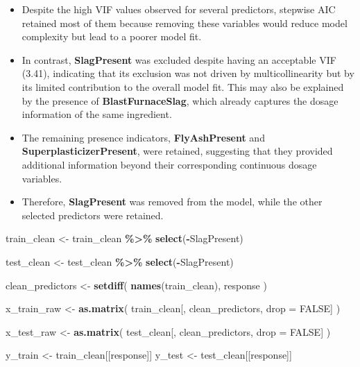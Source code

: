\documentclass[
  11pt,
]{article}
\newenvironment{Shaded}{\begin{snugshade}}{\end{snugshade}}
\newcommand{\AttributeTok}[1]{\textcolor[rgb]{0.13,0.29,0.53}{#1}}
\newcommand{\ConstantTok}[1]{\textcolor[rgb]{0.56,0.35,0.01}{#1}}
\newcommand{\FunctionTok}[1]{\textcolor[rgb]{0.13,0.29,0.53}{\textbf{#1}}}
\newcommand{\NormalTok}[1]{#1}
\newcommand{\OtherTok}[1]{\textcolor[rgb]{0.56,0.35,0.01}{#1}}
\newcommand{\SpecialCharTok}[1]{\textcolor[rgb]{0.81,0.36,0.00}{\textbf{#1}}}
\begin{document}
\begin{itemize}
\item
  Despite the high VIF values observed for several predictors, stepwise
  AIC retained most of them because removing these variables would
  reduce model complexity but lead to a poorer model fit.
\item
  In contrast, \textbf{SlagPresent} was excluded despite having an
  acceptable VIF (3.41), indicating that its exclusion was not driven by
  multicollinearity but by its limited contribution to the overall model
  fit. This may also be explained by the presence of
  \textbf{BlastFurnaceSlag}, which already captures the dosage
  information of the same ingredient.
\item
  The remaining presence indicators, \textbf{FlyAshPresent} and
  \textbf{SuperplasticizerPresent}, were retained, suggesting that they
  provided additional information beyond their corresponding continuous
  dosage variables.
\item
  Therefore, \textbf{SlagPresent} was removed from the model, while the
  other selected predictors were retained.
\end{itemize}

\begin{Shaded}
\begin{Highlighting}[]
\NormalTok{train\_clean }\OtherTok{\textless{}{-}}\NormalTok{ train\_clean }\SpecialCharTok{\%\textgreater{}\%}
  \FunctionTok{select}\NormalTok{(}\SpecialCharTok{{-}}\NormalTok{SlagPresent)}

\NormalTok{test\_clean }\OtherTok{\textless{}{-}}\NormalTok{ test\_clean }\SpecialCharTok{\%\textgreater{}\%}
  \FunctionTok{select}\NormalTok{(}\SpecialCharTok{{-}}\NormalTok{SlagPresent)}

\NormalTok{clean\_predictors }\OtherTok{\textless{}{-}} \FunctionTok{setdiff}\NormalTok{(}
  \FunctionTok{names}\NormalTok{(train\_clean),}
\NormalTok{  response}
\NormalTok{)}

\NormalTok{x\_train\_raw }\OtherTok{\textless{}{-}} \FunctionTok{as.matrix}\NormalTok{(}
\NormalTok{  train\_clean[, clean\_predictors, }\AttributeTok{drop =} \ConstantTok{FALSE}\NormalTok{]}
\NormalTok{)}

\NormalTok{x\_test\_raw }\OtherTok{\textless{}{-}} \FunctionTok{as.matrix}\NormalTok{(}
\NormalTok{  test\_clean[, clean\_predictors, }\AttributeTok{drop =} \ConstantTok{FALSE}\NormalTok{]}
\NormalTok{)}

\NormalTok{y\_train }\OtherTok{\textless{}{-}}\NormalTok{ train\_clean[[response]]}
\NormalTok{y\_test }\OtherTok{\textless{}{-}}\NormalTok{ test\_clean[[response]]}
\end{Highlighting}
\end{Shaded}
\end{document}

